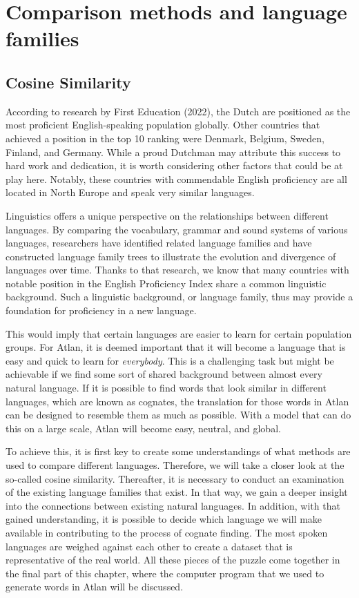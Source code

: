 \section{Comparison methods and language families}

\subsection{Cosine Similarity}

According to research by First Education (2022), the Dutch are positioned as the most proficient English-speaking population globally. Other countries that achieved a position in the top 10 ranking were Denmark, Belgium, Sweden, Finland, and Germany. While a proud Dutchman may attribute this success to hard work and dedication, it is worth considering other factors that could be at play here. Notably, these countries with commendable English proficiency are all located in North Europe and speak very similar languages.  

Linguistics offers a unique perspective on the relationships between different languages. By comparing the vocabulary, grammar and sound systems of various languages, researchers have identified related language families and have constructed language family trees to illustrate the evolution and divergence of languages over time. Thanks to that research, we know that many countries with notable position in the English Proficiency Index share a common linguistic background. Such a linguistic background, or language family, thus may provide a foundation for proficiency in a new language. 

This would imply that certain languages are easier to learn for certain population groups. For Atlan, it is deemed important that it will become a language that is easy and quick to learn for \textit{everybody}. This is a challenging task but might be achievable if we find some sort of shared background between almost every natural language. If it is possible to find words that look similar in different languages, which are known as cognates, the translation for those words in Atlan can be designed to resemble them as much as possible. With a model that can do this on a large scale, Atlan will become easy, neutral, and global.  

To achieve this, it is first key to create some understandings of what methods are used to compare different languages. Therefore, we will take a closer look at the so-called cosine similarity. Thereafter, it is necessary to conduct an examination of the existing language families that exist. In that way, we gain a deeper insight into the connections between existing natural languages. In addition, with that gained understanding, it is possible to decide which language we will make available in contributing to the process of cognate finding. The most spoken languages are weighed against each other to create a dataset that is representative of the real world. All these pieces of the puzzle come together in the final part of this chapter, where the computer program that we used to generate words in Atlan will be discussed.
\vspace{0.3cm}

